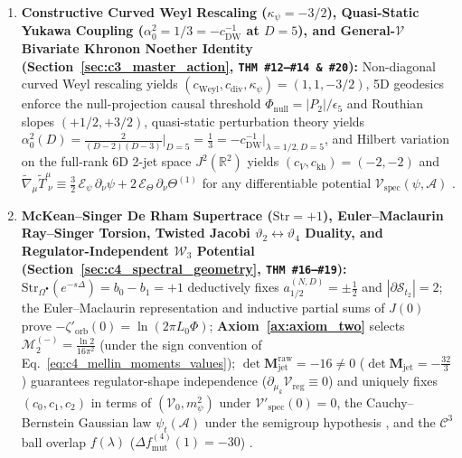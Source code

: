 \documentclass[11pt,a4paper]{article}
\newcommand{\catD}{\text{\textbf{\textcolor{blue!75!black}{[D]}}}}
\newcommand{\catH}{\text{\textbf{\textcolor{orange!80!black}{[H]}}}}
\theoremstyle{definition}
\theoremstyle{plain}
\theoremstyle{remark}
\begin{document}
\begin{enumerate}[label=\arabic*.]
  \item \textbf{Constructive Curved Weyl Rescaling ($\kappa_\psi=-3/2$), Quasi-Static Yukawa Coupling ($\alpha_0^2 = 1/3 = -c_{\mathrm{DW}}^{-1}$ at $D = 5$), and General-$\mathcal{V}$ Bivariate Khronon Noether Identity (Section~\ref{sec:c3_master_action}, \texttt{THM~\#12--\#14 \& \#20}):} Non-diagonal curved Weyl rescaling yields $(c_{\mathrm{Weyl}}, c_{\mathrm{div}}, \kappa_\psi) = (1, 1, -3/2)$, 5D geodesics enforce the null-projection causal threshold $\Phi_{\mathrm{null}} = |P_2|/\epsilon_5$ and Routhian slopes $(+1/2, +3/2)$, quasi-static perturbation theory yields $\alpha_0^2(D) = \frac{2}{(D-2)(D-3)}\big|_{D=5} = \frac{1}{3} = -c_{\mathrm{DW}}^{-1}\big|_{\lambda=1/2, D=5}$, and Hilbert variation on the full-rank 6D 2-jet space $J^2(\mathbb{R}^2)$ yields $(c_V, c_{\mathrm{kh}}) = (-2, -2)$ and $\tilde{\nabla}_\mu\tilde{T}^\mu_{\;\nu} \equiv \frac{3}{2}\,\mathcal{E}_\psi\,\partial_\nu\psi + 2\,\mathcal{E}_\Theta\,\partial_\nu\Theta^{(1)}$ for any differentiable potential $\mathcal{V}_{\mathrm{spec}}(\psi, \mathcal{A})$ \catD.
  \item \textbf{McKean--Singer De Rham Supertrace ($\mathrm{Str}=+1$), Euler--Maclaurin Ray--Singer Torsion, Twisted Jacobi $\vartheta_2 \leftrightarrow \vartheta_4$ Duality, and Regulator-Independent $\mathcal{W}_3$ Potential (Section~\ref{sec:c4_spectral_geometry}, \texttt{THM~\#16--\#19}):} $\mathrm{Str}_{\Omega^\bullet}(e^{-s\Delta}) = b_0 - b_1 = +1$ deductively fixes $a_{1/2}^{(N,D)} = \pm\frac{1}{2}$ and $|\partial\mathcal{S}_{t_2}|=2$; the Euler--Maclaurin representation and inductive partial sums of $J(0)$ prove $-\zeta'_{\mathrm{orb}}(0) = \ln(2\pi L_0\Phi)$; \textbf{Axiom~\ref{ax:axiom_two}} selects $\mathcal{M}_2^{(-)} = \frac{\ln 2}{16\pi^2}$ (under the sign convention of Eq.~\eqref{eq:c4_mellin_moments_values}); $\det\mathbf{M}_{\mathrm{jet}}^{\mathrm{raw}} = -16 \neq 0$ ($\det\mathbf{M}_{\mathrm{jet}} = -\frac{32}{3}$) guarantees regulator-shape independence ($\partial_{\mu_k}\mathcal{V}_{\mathrm{reg}} \equiv 0$) and uniquely fixes $(c_0, c_1, c_2)$ in terms of $(\mathcal{V}_0, m_\psi^2)$ under $\mathcal{V}'_{\mathrm{spec}}(0)=0$, the Cauchy--Bernstein Gaussian law $\psi_t(\mathcal{A})$ under the semigroup hypothesis \catH, and the $\mathcal{C}^3$ ball overlap $f(\lambda)$ ($\Delta f_{\mathrm{mut}}^{(4)}(1) = -30$) \catD.

\end{enumerate}
\end{document}
